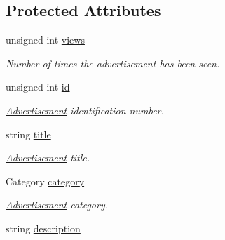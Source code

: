 \subsection*{Protected Attributes}
\begin{DoxyCompactItemize}
\item 
\hypertarget{class_advertisement_afa7bb3d8371e8fdc476614f472f31ec9}{}unsigned int \hyperlink{class_advertisement_afa7bb3d8371e8fdc476614f472f31ec9}{views}\label{class_advertisement_afa7bb3d8371e8fdc476614f472f31ec9}

\begin{DoxyCompactList}\small\item\em Number of times the advertisement has been seen. \end{DoxyCompactList}\item 
\hypertarget{class_advertisement_a0cb0d85726a8f955d2ab8bb312814e88}{}unsigned int \hyperlink{class_advertisement_a0cb0d85726a8f955d2ab8bb312814e88}{id}\label{class_advertisement_a0cb0d85726a8f955d2ab8bb312814e88}

\begin{DoxyCompactList}\small\item\em \hyperlink{class_advertisement}{Advertisement} identification number. \end{DoxyCompactList}\item 
\hypertarget{class_advertisement_a63b197da6f91139ed6baf700f834a3db}{}string \hyperlink{class_advertisement_a63b197da6f91139ed6baf700f834a3db}{title}\label{class_advertisement_a63b197da6f91139ed6baf700f834a3db}

\begin{DoxyCompactList}\small\item\em \hyperlink{class_advertisement}{Advertisement} title. \end{DoxyCompactList}\item 
\hypertarget{class_advertisement_af77599e289974c0e4f502db621257fe5}{}Category \hyperlink{class_advertisement_af77599e289974c0e4f502db621257fe5}{category}\label{class_advertisement_af77599e289974c0e4f502db621257fe5}

\begin{DoxyCompactList}\small\item\em \hyperlink{class_advertisement}{Advertisement} category. \end{DoxyCompactList}\item 
\hypertarget{class_advertisement_afb0909f9fceabb44804e06e721ff7fee}{}string \hyperlink{class_advertisement_afb0909f9fceabb44804e06e721ff7fee}{description}\label{class_advertisement_afb0909f9fceabb44804e06e721ff7fee}


\end{DoxyCompactItemize}
